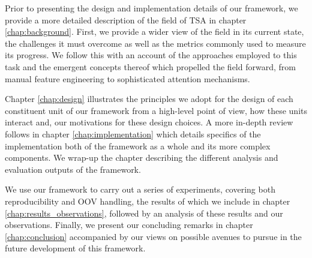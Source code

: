 \documentclass[../../fyp.tex]{subfiles}
\begin{document}
Prior to presenting the design and implementation details of our framework, we provide a more detailed description of the field of TSA in chapter \ref{chap:background}. First, we provide a wider view of the field in its current state, the challenges it must overcome as well as the metrics commonly used to measure its progress. We follow this with an account of the approaches employed to this task and the emergent concepts thereof which propelled the field forward, from manual feature engineering to sophisticated attention mechanisms. 

Chapter \ref{chap:design} illustrates the principles we adopt for the design of each constituent unit of our framework from a high-level point of view, how these units interact and, our motivations for these design choices. A more in-depth review follows in chapter \ref{chap:implementation} which details specifics of the implementation both of the framework as a whole and its more complex components. We wrap-up the chapter describing the different analysis and evaluation outputs of the framework. 

We use our framework to carry out a series of experiments, covering both reproducibility and OOV handling, the results of which we include in chapter \ref{chap:results_observations}, followed by an analysis of these results and our observations. Finally, we present our concluding remarks in chapter \ref{chap:conclusion} accompanied by our views on possible avenues to pursue in the future development of this framework.
\end{document}
